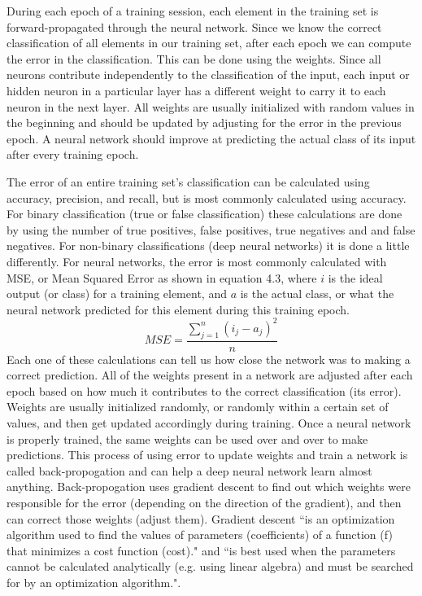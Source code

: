 \documentclass[12pt]{report} %
\begin{document}
	During each epoch of a training session, each element in the training set is forward-propagated through the neural network. Since we know the correct classification of all elements in our training set, after each epoch we can compute the error in the classification. This can be done using the weights. Since all neurons contribute independently to the classification of the input, each input or hidden neuron in a particular layer has a different weight to carry it to each neuron in the next layer. All weights are usually initialized with random values in the beginning and should be updated by adjusting for the error in the previous epoch. A neural network should improve at predicting the actual class of its input after every training epoch. 
	
	The error of an entire training set's classification can be calculated using accuracy, precision, and recall, but is most commonly calculated using accuracy.  For binary classification (true or false classification) these calculations are done by using the number of true positives, false positives, true negatives and and false negatives. For non-binary classifications (deep neural networks) it is done a little differently. For neural networks, the error is most commonly calculated with MSE, or Mean Squared Error as shown in equation 4.3, where $i$ is the ideal output (or class) for a training element, and $a$ is the actual class, or what the neural network predicted for this element during this training epoch\cite{errorHeaton}.
\begin{equation}
MSE = \frac{\sum\limits_{j=1}^n (i_{j} - a_{j})^2}{n}
\end{equation}		
	Each one of these calculations can tell us how close the network was to making a correct prediction. All of the weights present in a network are adjusted after each epoch based on how much it contributes to the correct classification (its error). Weights are usually initialized randomly, or randomly within a certain set of values, and then get updated accordingly during training\cite{errorHeaton}. Once a neural network is properly trained, the same weights can be used over and over to make predictions. This process of using error to update weights and train a network is called back-propogation and can help a deep neural network learn almost anything\cite{KubatMachineLearn}. 
	Back-propogation uses gradient descent to find out which weights were responsible for the error (depending on the direction of the gradient), and then can correct those weights (adjust them). Gradient descent ``is an optimization algorithm used to find the values of parameters (coefficients) of a function (f) that minimizes a cost function (cost)." and ``is best used when the parameters cannot be calculated analytically (e.g. using linear algebra) and must be searched for by an optimization algorithm."\cite{gradientMastry}.
	
\end{document}
